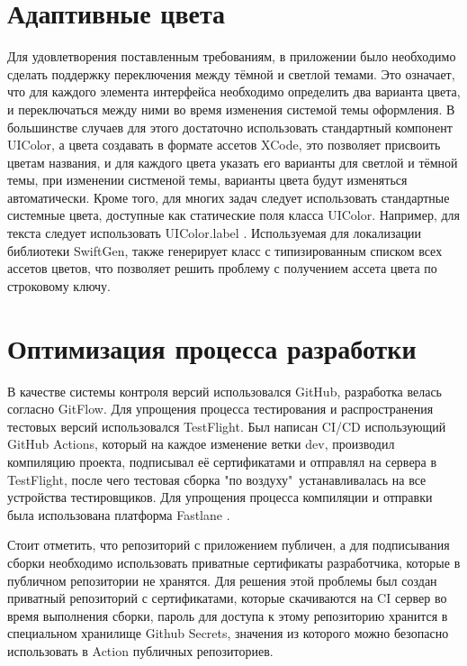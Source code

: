   \section{Адаптивные цвета}
    Для удовлетворения поставленным требованиям, в приложении было необходимо сделать поддержку переключения между тёмной и светлой темами. Это означает, что для каждого элемента интерфейса необходимо определить два варианта цвета, и переключаться между ними во время изменения системой темы оформления. В большинстве случаев для этого достаточно использовать стандартный компонент UIColor, а цвета создавать в формате ассетов XCode, это позволяет присвоить цветам названия, и для каждого цвета указать его варианты для светлой и тёмной темы, при изменении систменой темы, варианты цвета будут изменяться автоматически. Кроме того, для многих задач следует использовать стандартные системные цвета, доступные как статические поля класса UIColor. Например, для текста следует использовать UIColor.label\cite{dark-color-cheat-sheet} .
    Используемая для локализации библиотеки SwiftGen, также генерирует класс с типизированным списком всех ассетов цветов, что позволяет решить проблему с получением ассета цвета по строковому ключу.

  \section{Оптимизация процесса разработки}
    В качестве системы контроля версий использовался GitHub, разработка велась согласно GitFlow. Для упрощения процесса тестирования и распространения тестовых версий использовался TestFlight. Был написан CI/CD использующий GitHub Actions, который на каждое изменение ветки dev, производил компиляцию проекта, подписывал её сертификатами и отправлял на сервера в TestFlight, после чего тестовая сборка "по воздуху"\ устанавливалась на все устройства тестировщиков. Для упрощения процесса компиляции и отправки была использована платформа Fastlane \cite{Fastlane}.

    Стоит отметить, что репозиторий с приложением публичен, а для подписывания сборки необходимо использовать приватные сертификаты разработчика, которые в публичном репозитории не хранятся. Для решения этой проблемы был создан приватный репозиторий с сертификатами, которые скачиваются на CI сервер во время выполнения сборки, пароль для доступа к этому репозиторию хранится в специальном хранилище Github Secrets, значения из которого можно безопасно использовать в Action публичных репозиториев.

